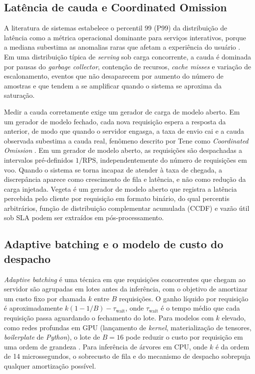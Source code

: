 \subsection{Latência de cauda e Coordinated Omission}

A literatura de sistemas estabelece o percentil 99 (P99) da distribuição de
latência como a métrica operacional dominante para serviços interativos,
porque a mediana subestima as anomalias raras que afetam a experiência do
usuário \cite{dean2013}. Em uma distribuição típica de \textit{serving} sob
carga concorrente, a cauda é dominada por pausas do \textit{garbage
collector}, contenção de recursos, \textit{cache misses} e variação de
escalonamento, eventos que não desaparecem por aumento do número de
amostras e que tendem a se amplificar quando o sistema se aproxima da
saturação.

Medir a cauda corretamente exige um gerador de carga de modelo aberto. Em um
gerador de modelo fechado, cada nova requisição espera a resposta da
anterior, de modo que quando o servidor engasga, a taxa de envio cai e a
cauda observada subestima a cauda real, fenômeno descrito por Tene como
\textit{Coordinated Omission} \cite{tene2015}. Em um gerador de modelo
aberto, as requisições são despachadas a intervalos pré-definidos
$1/\text{RPS}$, independentemente do número de requisições em voo. Quando o
sistema se torna incapaz de atender à taxa de chegada, a discrepância
aparece como crescimento de fila e latência, e não como redução da carga
injetada. Vegeta \cite{vegeta2024} é um gerador de modelo aberto que registra
a latência percebida pelo cliente por requisição em formato binário, do qual
percentis arbitrários, função de distribuição complementar acumulada (CCDF)
e vazão útil sob SLA podem ser extraídos em pós-processamento.

\subsection{Adaptive batching e o modelo de custo do despacho}

\textit{Adaptive batching} é uma técnica em que requisições concorrentes que
chegam ao servidor são agrupadas em lotes antes da inferência, com o objetivo
de amortizar um custo fixo por chamada $k$ entre $B$ requisições. O ganho
líquido por requisição é aproximadamente $k(1 - 1/B) - \tau_{\text{wait}}$,
onde $\tau_{\text{wait}}$ é o tempo médio que cada requisição passa
aguardando o fechamento do lote. Para modelos com $k$ elevado, como redes
profundas em GPU (lançamento de \textit{kernel}, materialização de tensores,
\textit{boilerplate} de \textit{Python}), o lote de $B = 16$ pode reduzir o
custo por requisição em uma ordem de grandeza
\cite{nakandala2020}. Para inferência de árvores em CPU, onde $k$ é da ordem
de 14 microssegundos, o sobrecusto de fila e do mecanismo de despacho
sobrepuja qualquer amortização possível.

